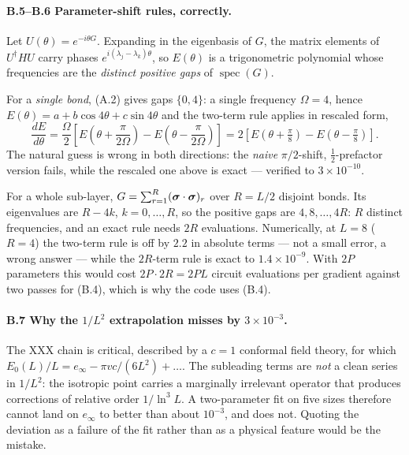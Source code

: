 \paragraph{\textsf{B.5}--\textsf{B.6} Parameter-shift rules, correctly.}
Let $U(\theta)=e^{-i\theta G}$. Expanding in the eigenbasis of $G$, the matrix
elements of $U^\dagger H U$ carry phases $e^{i(\lambda_j-\lambda_k)\theta}$, so
$E(\theta)$ is a trigonometric polynomial whose frequencies are the
\emph{distinct positive gaps} of $\operatorname{spec}(G)$.

For a \emph{single bond}, (A.2) gives gaps $\{0,4\}$: a single frequency
$\Omega=4$, hence $E(\theta)=a+b\cos4\theta+c\sin4\theta$ and the two-term rule
applies in rescaled form,
\begin{equation}
  \frac{dE}{d\theta}
  = \frac{\Omega}{2}\left[E\!\left(\theta+\frac{\pi}{2\Omega}\right)
    - E\!\left(\theta-\frac{\pi}{2\Omega}\right)\right]
  = 2\left[E\!\left(\theta+\tfrac{\pi}{8}\right)-E\!\left(\theta-\tfrac{\pi}{8}\right)\right].
  \tag{B.5}
\end{equation}
The natural guess is wrong in both directions: the \emph{naive} $\pi/2$-shift,
$\tfrac12$-prefactor version fails, while the rescaled one above is exact ---
verified to $3\times10^{-10}$.

For a whole sub-layer, $G=\sum_{r=1}^{R}(\bm{\sigma}\cdot\bm{\sigma})_r$ over $R=L/2$
disjoint bonds. Its eigenvalues are $R-4k$, $k=0,\dots,R$, so the positive gaps
are $4,8,\dots,4R$: $R$ distinct frequencies, and an exact rule needs $2R$
evaluations. Numerically, at $L=8$ ($R=4$) the two-term rule is off by
$2.2$ in absolute terms --- not a small error, a wrong answer --- while the
$2R$-term rule is exact to $1.4\times10^{-9}$. With $2P$ parameters this would
cost $2P\cdot 2R = 2PL$ circuit evaluations per gradient against two passes
for (B.4), which is why the code uses (B.4).

\paragraph{\textsf{B.7} Why the $1/L^2$ extrapolation misses by $3\times10^{-3}$.}
The XXX chain is critical, described by a $c=1$ conformal field theory, for
which $E_0(L)/L = e_\infty - \pi v c/(6L^2) + \dots$. The subleading terms are
\emph{not} a clean series in $1/L^2$: the isotropic point carries a marginally
irrelevant operator that produces corrections of relative order
$1/\ln^3 L$. A two-parameter fit on five sizes therefore cannot land on
$e_\infty$ to better than about $10^{-3}$, and does not. Quoting the deviation
as a failure of the fit rather than as a physical feature would be the mistake.

